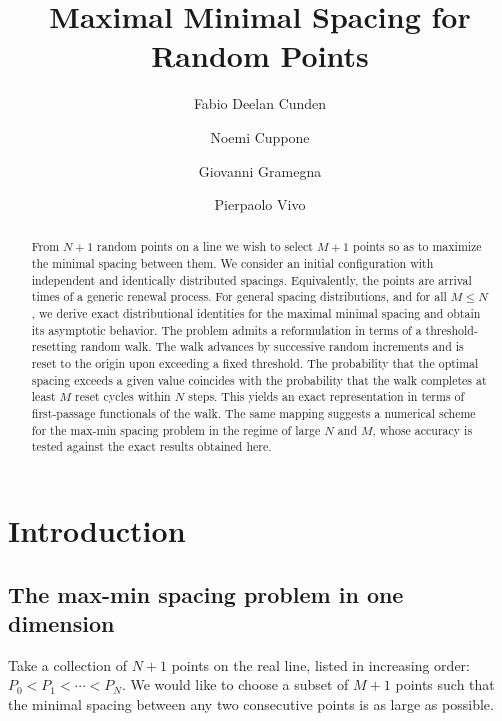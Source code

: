 \documentclass[a4paper,reqno,11pt]{amsart}
\title{Maximal Minimal Spacing for Random Points}
\author{}
\numberwithin{equation}{section}
\numberwithin{thm}{section}
\theoremstyle{plain}
\theoremstyle{definition}
\begin{document}
\author[F.~D.~Cunden]{Fabio Deelan Cunden}
\address{Fabio Deelan Cunden -- Dipartimento di Matematica, Universit\`a degli Studi di Bari, i-70125 Bari, Italy, and INFN, Sezione di Bari, i-70126 Bari, Italy}

\author[N.~Cuppone]{Noemi Cuppone}
\address{Noemi Cuppone -- Department of Mathematics, King’s College London, Strand, London, WC2R 2LS, United Kingdom}

\author[G.~Gramegna]{Giovanni Gramegna}
\address{Giovanni Gramegna -- Dipartimento di Fisica, Universit\`a degli Studi di Bari, i-70126 Bari, Italy, and INFN, Sezione di Bari, i-70126 Bari, Italy}

\author[P.~Vivo]{Pierpaolo Vivo}
\address{Pierpaolo Vivo -- Department of Mathematics, King’s College London, Strand, London, WC2R 2LS, United Kingdom}

\maketitle
\begin{abstract}
From $N+1$ random points on a line we wish to select $M+1$ points so as to maximize the minimal spacing between them. We consider an initial configuration with independent and identically distributed  spacings. {Equivalently, the points are arrival times of a generic renewal process.}  For general spacing distributions, and for all $M\leq N$, we derive exact distributional identities for the {maximal minimal} spacing and obtain its asymptotic behavior.
The problem admits a reformulation in terms of a threshold-resetting random walk. The walk advances by successive random increments and is reset to the origin upon exceeding a fixed threshold. The probability that the optimal spacing exceeds a given value coincides with the probability that the walk completes at least $M$ reset cycles within $N$ steps. This yields an exact representation in terms of first-passage functionals of the walk. 
The same mapping suggests a numerical scheme for the max-min spacing problem in the regime of large  $N$ and $M$, whose accuracy is tested against the exact results obtained here.
\end{abstract}


\section{Introduction}
\subsection{The max-min spacing problem {in one dimension}}
Take a collection of $N+1$ points on the  real line, listed in increasing order: $P_0 < P_1 < \cdots < P_N$. 
We would like to choose a subset of $M+1$ points such that the minimal spacing between any two consecutive points is as large as possible.  
\end{document}
